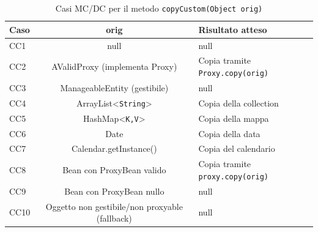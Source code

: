 \documentclass[10pt]{article}
\begin{document}
{		
		\begin{table}[h]
			\centering
			\begin{tabular}{|l|c|l|}
				\hline
				\textbf{Caso} & \textbf{orig} & \textbf{Risultato atteso} \\
				\hline
				CC1 & null & null \\
				\hline
				CC2 & AValidProxy (implementa Proxy) & Copia tramite \texttt{Proxy.copy(orig)} \\
				\hline
				CC3 & ManageableEntity (gestibile) & null \\
				\hline
				CC4 & ArrayList\textless{}\texttt{String}\textgreater{} & Copia della collection \\
				\hline
				CC5 & HashMap\textless{}\texttt{K,V}\textgreater{} & Copia della mappa \\
				\hline
				CC6 & Date & Copia della data \\
				\hline
				CC7 & Calendar.getInstance() & Copia del calendario \\
				\hline
				CC8 & Bean con ProxyBean valido & Copia tramite \texttt{proxy.copy(orig)} \\
				\hline
				CC9 & Bean con ProxyBean nullo & null \\
				\hline
				CC10 & Oggetto non gestibile/non proxyable (fallback) & null \\
				\hline
			\end{tabular}
			\caption{Casi MC/DC per il metodo \texttt{copyCustom(Object orig)}}
			\label{tab:mcdc_copycustom}
		\end{table}
		
}
\end{document}

